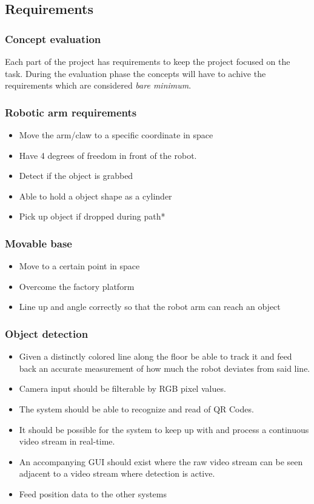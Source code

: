 \documentclass{beamer}
\begin{document}
\begin{frame}
    \subsection{Requirements}
    \frametitle{Concept evaluation}
    Each part of the project has requirements to keep the project focused 
    on the task. During the evaluation phase the concepts will have to achive
    the requirements which are considered \textit{bare minimum}. 
\end{frame}

\begin{frame}
    \frametitle{Robotic arm requirements}
    \begin{itemize}
        \item Move the arm/claw to a specific coordinate in space
        \item Have 4 degrees of freedom in front of the robot.
        \item Detect if the object is grabbed
        \item Able to hold a object shape as a cylinder
        \item Pick up object if dropped during path*
    \end{itemize}
\end{frame}

\begin{frame}
    \frametitle{Movable base}
    \begin{itemize}
        \item Move to a certain point in space
        \item Overcome the factory platform
        \item Line up and angle correctly so that the robot arm can reach an object
    \end{itemize}
\end{frame}

\begin{frame}
    \frametitle{Object detection}
    \begin{itemize}
        \item Given a distinctly colored line along the floor be able to track it and
        feed back an accurate measurement of how much the robot deviates from said line.
        \item Camera input should be filterable by RGB pixel values.
        \item The system should be able to recognize and read of QR Codes.
        \item It should be possible for the system to keep up with and process a continuous video stream in real-time.
        \item An accompanying GUI should exist where the raw video stream can be seen adjacent to a video stream where detection is active.
        \item Feed position data to the other systems
    \end{itemize}
\end{frame}
\end{document}
